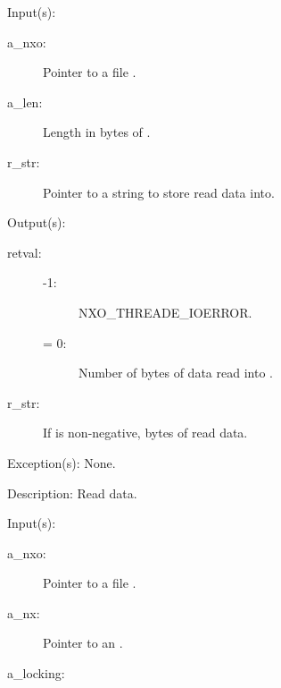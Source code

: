 \begin{capi}
\begin{capilist}
	\end{capilist}
\label{nxo_file_read}
	\begin{capilist}
	\item[Input(s): ]
		\begin{description}\item[]
		\item[a\_nxo: ]
			Pointer to a file .
		\item[a\_len: ]
			Length in bytes of .
		\item[r\_str: ]
			Pointer to a string to store read data into.
		\end{description}
	\item[Output(s): ]
		\begin{description}\item[]
		\item[retval: ]
			\begin{description}\item[]
			\item[-1: ]
				{NXO_THREADE_IOERROR}.
			\item[{\gt}= 0: ]
				Number of bytes of data read into .
			\end{description}\item[]
		\item[r\_str: ]
			If  is non-negative,  bytes of
			read data.
		\end{description}
	\item[Exception(s): ] None.
	\item[Description: ]
		Read data.
	\end{capilist}
\label{nxo_file_readline}
	\begin{capilist}
	\item[Input(s): ]
		\begin{description}\item[]
		\item[a\_nxo: ]
			Pointer to a file \classname{nxo}.
		\item[a\_nx: ]
			Pointer to an \classname{nx}.
		\item[a\_locking: ]

\end{description}
\end{capilist}
\end{capi}
